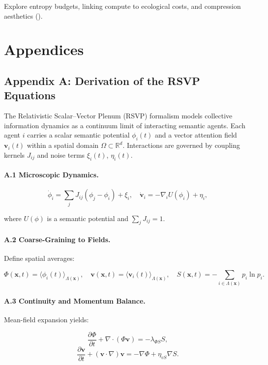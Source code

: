 \documentclass[12pt]{article}
\begin{document}
Explore entropy budgets, linking compute to ecological costs, and compression aesthetics (\citealp{Feenberg1999}).

\section*{Appendices}

\subsection*{Appendix A: Derivation of the RSVP Equations}

The Relativistic Scalar–Vector Plenum (RSVP) formalism models collective information dynamics as a continuum limit of interacting semantic agents. Each agent \(i\) carries a scalar semantic potential \(\phi_i(t)\) and a vector attention field \(\mathbf{v}_i(t)\) within a spatial domain \(\Omega \subset \mathbb{R}^d\). Interactions are governed by coupling kernels \(J_{ij}\) and noise terms \(\xi_i(t)\), \(\eta_i(t)\).

\paragraph{A.1 Microscopic Dynamics.}

\[
\dot{\phi}_i = \sum_{j} J_{ij} (\phi_j - \phi_i) + \xi_i, \quad \dot{\mathbf{v}}_i = -\nabla_i U(\phi_i) + \eta_i,
\]

where \(U(\phi)\) is a semantic potential and \(\sum_j J_{ij} = 1\).

\paragraph{A.2 Coarse-Graining to Fields.}

Define spatial averages:

\[
\Phi(\mathbf{x},t) = \langle \phi_i(t) \rangle_{\Lambda(\mathbf{x})}, \quad \mathbf{v}(\mathbf{x},t) = \langle \mathbf{v}_i(t) \rangle_{\Lambda(\mathbf{x})}, \quad S(\mathbf{x},t) = -\sum_{i \in \Lambda(\mathbf{x})} p_i \ln p_i.
\]

\paragraph{A.3 Continuity and Momentum Balance.}

Mean-field expansion yields:

\[
\frac{\partial \Phi}{\partial t} + \nabla \cdot (\Phi \mathbf{v}) = -\lambda_{\Phi S} S,
\]
\[
\frac{\partial \mathbf{v}}{\partial t} + (\mathbf{v} \cdot \nabla) \mathbf{v} = -\nabla \Phi + \eta_{vS} \nabla S.
\]
\end{document}
